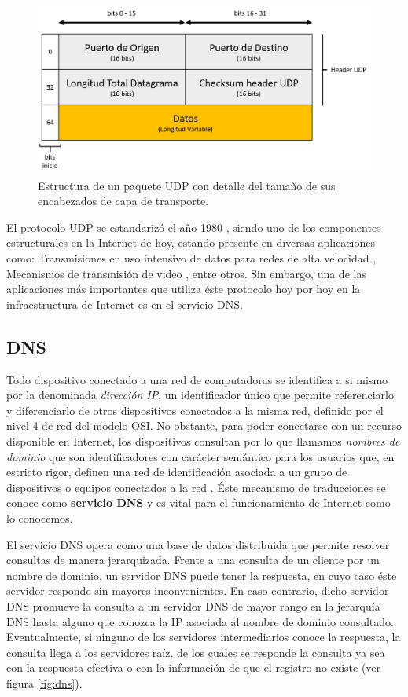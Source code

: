 \begin{figure}[!h]
	\centering
	\includegraphics[scale=.55]{imagenes/estructuraUDP.png}
	\caption{Estructura de un paquete UDP con detalle del tamaño de sus encabezados de capa de transporte.}
	\label{fig:datagramaudp}
\end{figure}

El protocolo UDP se estandarizó el año 1980 \cite{rfc:768}, siendo uno de los componentes estructurales en la Internet de hoy, estando presente en diversas aplicaciones como: Transmisiones en uso intensivo de datos para redes de alta velocidad \cite{udp:highbandwidth}, Mecanismos de transmisión de video \cite{udp:video}, entre otros. Sin embargo, una de las aplicaciones más importantes que utiliza éste protocolo hoy por hoy en la infraestructura de Internet es en el servicio DNS.

\subsection{DNS}
Todo dispositivo conectado a una red de computadoras se identifica a si mismo por la denominada \emph{dirección IP}, un identificador único que permite referenciarlo y diferenciarlo de otros dispositivos conectados a la misma red, definido por el nivel 4 de red del modelo OSI. No obstante, para poder conectarse con un recurso disponible en Internet, los dispositivos consultan por lo que llamamos \emph{nombres de dominio} que son identificadores con carácter semántico para los usuarios que, en estricto rigor, definen una red de identificación asociada a un grupo de dispositivos o equipos conectados a la red \cite{wiki:nombre_dominio}. Éste mecanismo de traducciones se conoce como \textbf{servicio DNS} y es vital para el funcionamiento de Internet como lo conocemos.

El servicio DNS \cite{rfc:1034, rfc:1035} opera como una base de datos distribuida que permite resolver consultas de manera jerarquizada. Frente a una consulta de un cliente por un nombre de dominio, un servidor DNS puede tener la respuesta, en cuyo caso éste servidor responde sin mayores inconvenientes. En caso contrario, dicho servidor DNS promueve la consulta a un servidor DNS de mayor rango en la jerarquía DNS hasta alguno que conozca la IP asociada al nombre de dominio consultado. Eventualmente, si ninguno de los servidores intermediarios conoce la respuesta, la consulta llega a los servidores raíz, de los cuales se responde la consulta ya sea con la respuesta efectiva o con la información de que el registro no existe (ver figura \ref{fig:dns}).

